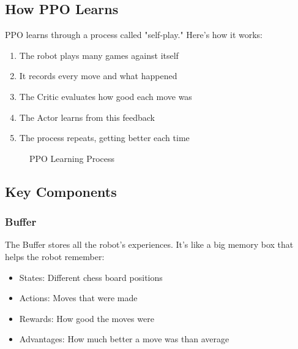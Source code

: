 \documentclass[11pt]{article}
\begin{document}
\subsection{How PPO Learns}

PPO learns through a process called "self-play." Here's how it works:

\begin{enumerate}
    \item The robot plays many games against itself
    \item It records every move and what happened
    \item The Critic evaluates how good each move was
    \item The Actor learns from this feedback
    \item The process repeats, getting better each time
\end{enumerate}

\begin{figure}[h]
    \centering
    \caption{PPO Learning Process}
    \label{fig:ppo_learning}
\end{figure}

\subsection{Key Components}

\subsubsection{Buffer}
The Buffer stores all the robot's experiences. It's like a big memory box that helps the robot remember:
\begin{itemize}
    \item States: Different chess board positions
    \item Actions: Moves that were made
    \item Rewards: How good the moves were
    \item Advantages: How much better a move was than average
\end{itemize}
\end{document}
